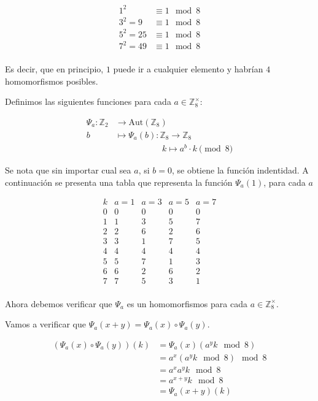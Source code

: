 \documentclass{article}
\begin{document}
    \[
      \begin{aligned}
        1^2 &\equiv 1 \mod 8\\
        3^2 = 9 &\equiv 1 \mod 8 \\
        5^2 = 25 &\equiv 1 \mod 8 \\
        7^2 = 49 &\equiv 1 \mod 8\\
      \end{aligned}
    \]

    Es decir, que en principio, $1$ puede ir a cualquier elemento y habrían $4$ homomorfismos posibles.

    Definimos las siguientes funciones para cada $a \in \mathbb{Z}_8^\times$:

    \[
      \begin{aligned}
        \Psi_a: \mathbb{Z}_2 &\to \text{Aut}(\mathbb{Z}_8) \\
        b &\mapsto \Psi_a(b): \mathbb{Z}_8 \to \mathbb{Z}_8 \\
        &\qquad\qquad\quad\ \ k \mapsto a^b \cdot k \pmod 8
      \end{aligned}
    \]

    Se nota que sin importar cual sea $a$, si $b = 0$, se obtiene la función indentidad. 
    A continuación se presenta una tabla que representa la función $\Psi_a(1)$, para cada $a$

    \[
      \begin{array}{c|cccc}
          k & a=1 & a=3 & a=5 & a=7 \\ \hline
          0 & 0 & 0 & 0 & 0 \\ 
          1 & 1 & 3 & 5 & 7 \\ 
          2 & 2 & 6 & 2 & 6 \\ 
          3 & 3 & 1 & 7 & 5 \\ 
          4 & 4 & 4 & 4 & 4 \\ 
          5 & 5 & 7 & 1 & 3 \\ 
          6 & 6 & 2 & 6 & 2 \\ 
          7 & 7 & 5 & 3 & 1 \\ 
      \end{array}
    \]

    Ahora debemos verificar que $\Psi_a$ es un homomorfismos para cada $a \in \mathbb{Z}_8^\times$.

    Vamos a verificar que $\Psi_a(x + y) = \Psi_a(x) \circ \Psi_a(y)$.

    \[
      \begin{aligned}
        (\Psi_a(x) \circ \Psi_a(y))(k) &= \Psi_a(x)(a^y k \mod 8) \\
        &= a^x (a^y k \mod 8) \mod 8 \\
        &= a^x a^y k \mod 8 \\
        &= a^{x + y} k \mod 8 \\
        &= \Psi_a(x+y)(k)
      \end{aligned}
    \]
\end{document}
